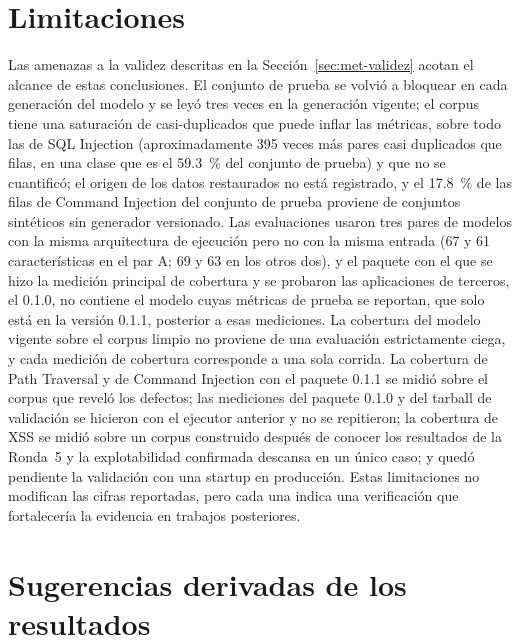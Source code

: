 \section{Limitaciones}
\label{sec:dis-limitaciones}

Las amenazas a la validez descritas en la Sección~\ref{sec:met-validez} acotan el alcance de estas
conclusiones. El conjunto de prueba se volvió a bloquear en cada generación del modelo y se leyó
tres veces en la generación vigente; el corpus tiene una saturación de casi-duplicados que puede
inflar las métricas, sobre todo las de SQL Injection (aproximadamente 395 veces más pares casi
duplicados que filas, en una clase que es el 59.3~\% del conjunto de prueba) y que no se
cuantificó; el origen de los datos restaurados no está registrado, y el
17.8~\% de las filas de Command Injection del conjunto de prueba proviene de conjuntos sintéticos
sin generador versionado. Las evaluaciones usaron tres pares de modelos con la misma arquitectura
de ejecución pero no con la misma entrada (67 y 61 características en el par A; 69 y 63 en los otros dos), y el paquete con el que se hizo la medición principal de cobertura y se probaron las aplicaciones de terceros, el 0.1.0, no contiene el modelo cuyas
métricas de prueba se reportan, que solo está en la versión 0.1.1, posterior a esas mediciones.
La cobertura del modelo vigente sobre el corpus limpio no proviene de una evaluación estrictamente
ciega, y cada medición de cobertura corresponde a una sola corrida. La cobertura de
Path Traversal y de Command Injection con el paquete 0.1.1 se midió sobre el corpus que reveló los
defectos; las mediciones del paquete 0.1.0 y del tarball de validación se hicieron con el ejecutor
anterior y no se repitieron; la cobertura de XSS se midió sobre un corpus construido después de
conocer los resultados de la Ronda~5 y la explotabilidad confirmada descansa en un único caso; y
quedó pendiente la validación con una startup en producción. Estas
limitaciones no modifican las cifras reportadas, pero cada una indica una verificación que
fortalecería la evidencia en trabajos posteriores.

\section{Sugerencias derivadas de los resultados}
\label{sec:dis-sugerencias}

